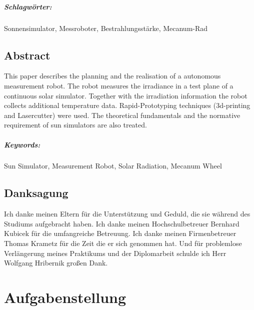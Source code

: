 \documentclass[a4paper,bibtotoc,oneside]{scrbook}
\begin{document}
\paragraph*{Schlagwörter:} Sonnensimulator, Messroboter, Bestrahlungsstärke, Mecanum-Rad


\newpage

\section*{Abstract}\thispagestyle{empty}
This paper describes the planning and the realisation of a autonomous measurement robot. The robot measures the irradiance in a test plane of a continuous solar simulator. Together with the irradiation information the robot collects additional temperature data. Rapid-Prototyping techniques (3d-printing and Lasercutter) were used. The theoretical fundamentals and the normative requirement of sun simulators are also treated.
\\ \vfill
\paragraph*{Keywords:} Sun Simulator, Measurement Robot, Solar Radiation, Mecanum Wheel
\newpage

\section*{Danksagung}\thispagestyle{empty}
Ich danke meinen Eltern für die Unterstützung und Geduld, die sie während des Studiums aufgebracht haben.
Ich danke meinen Hochschulbetreuer Bernhard Kubicek für die umfangreiche Betreuung.
Ich danke meinen Firmenbetreuer Thomas Krametz für die Zeit die er sich genommen hat.
Und für problemlose Verlängerung meines Praktikums und der Diplomarbeit schulde ich Herr Wolfgang Hribernik großen Dank.
\newpage

\tableofcontents\thispagestyle{empty}
\newpage

\setcounter{page}{1}

\chapter{Aufgabenstellung}
\end{document}
